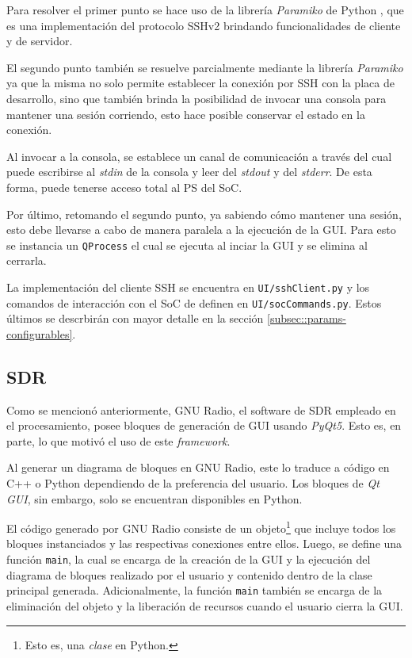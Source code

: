 \documentclass[../../main.tex]{subfiles}
\begin{document}
Para resolver el primer punto se hace uso de la librería \textit{Paramiko} de Python \cite{paramiko}, que es una implementación del protocolo SSHv2 brindando funcionalidades de cliente y de servidor.

El segundo punto también se resuelve parcialmente mediante la librería \textit{Paramiko} ya que la misma no solo permite establecer la conexión por SSH con la placa de desarrollo, sino que también brinda la posibilidad de invocar una consola para mantener una sesión corriendo, esto hace posible conservar el estado en la conexión. 

Al invocar a la consola, se establece un canal de comunicación a través del cual puede escribirse al \textit{stdin} de la consola y leer del \textit{stdout} y del \textit{stderr}. De esta forma, puede tenerse acceso total al PS del SoC.

Por último, retomando el segundo punto, ya sabiendo cómo mantener una sesión, esto debe llevarse a cabo de manera paralela a la ejecución de la GUI. Para esto se instancia un \texttt{QProcess} el cual se ejecuta al inciar la GUI y se elimina al cerrarla.

La implementación del cliente SSH se encuentra en \texttt{UI/sshClient.py} y los comandos de interacción con el SoC de definen en \texttt{UI/socCommands.py}. Estos últimos se descrbirán con mayor detalle en la sección \ref{subsec::params-configurables}.

\subsection{SDR}
Como se mencionó anteriormente, GNU Radio, el software de SDR empleado en el procesamiento, posee bloques de generación de GUI usando \textit{PyQt5}. Esto es, en parte, lo que motivó el uso de este \textit{framework}. 

Al generar un diagrama de bloques en GNU Radio, este lo traduce a código en C++ o Python dependiendo de la preferencia del usuario. Los bloques de \textit{Qt GUI}, sin embargo, solo se encuentran disponibles en Python. 

El código generado por GNU Radio consiste de un objeto\footnote{Esto es, una \textit{clase} en Python.} que incluye todos los bloques instanciados y las respectivas conexiones entre ellos. Luego, se define una función \texttt{main}, la cual se encarga de la creación de la GUI y la ejecución del diagrama de bloques realizado por el usuario y contenido dentro de la clase principal generada. Adicionalmente, la función \texttt{main} también se encarga de la eliminación del objeto y la liberación de recursos cuando el usuario cierra la GUI.
\end{document}
